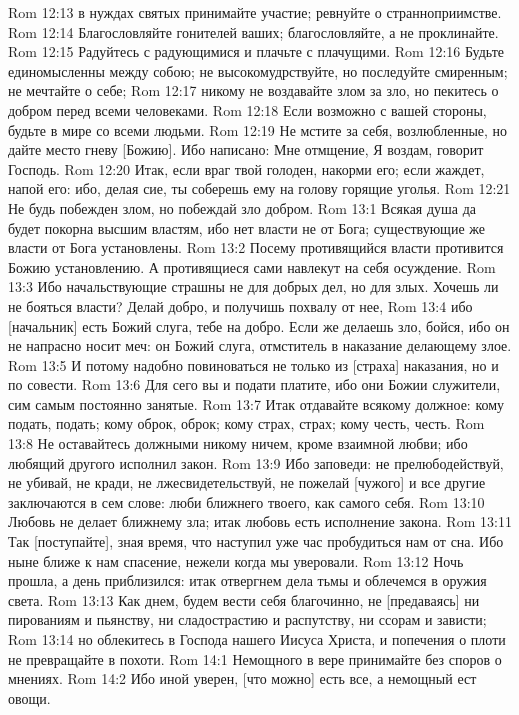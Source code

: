 Rom 12:13  в нуждах святых принимайте участие; ревнуйте о странноприимстве.
Rom 12:14  Благословляйте гонителей ваших; благословляйте, а не проклинайте.
Rom 12:15  Радуйтесь с радующимися и плачьте с плачущими.
Rom 12:16  Будьте единомысленны между собою; не высокомудрствуйте, но последуйте смиренным; не мечтайте о себе;
Rom 12:17  никому не воздавайте злом за зло, но пекитесь о добром перед всеми человеками.
Rom 12:18  Если возможно с вашей стороны, будьте в мире со всеми людьми.
Rom 12:19  Не мстите за себя, возлюбленные, но дайте место гневу [Божию]. Ибо написано: Мне отмщение, Я воздам, говорит Господь.
Rom 12:20  Итак, если враг твой голоден, накорми его; если жаждет, напой его: ибо, делая сие, ты соберешь ему на голову горящие уголья.
Rom 12:21  Не будь побежден злом, но побеждай зло добром.
Rom 13:1  Всякая душа да будет покорна высшим властям, ибо нет власти не от Бога; существующие же власти от Бога установлены.
Rom 13:2  Посему противящийся власти противится Божию установлению. А противящиеся сами навлекут на себя осуждение.
Rom 13:3  Ибо начальствующие страшны не для добрых дел, но для злых. Хочешь ли не бояться власти? Делай добро, и получишь похвалу от нее,
Rom 13:4  ибо [начальник] есть Божий слуга, тебе на добро. Если же делаешь зло, бойся, ибо он не напрасно носит меч: он Божий слуга, отмститель в наказание делающему злое.
Rom 13:5  И потому надобно повиноваться не только из [страха] наказания, но и по совести.
Rom 13:6  Для сего вы и подати платите, ибо они Божии служители, сим самым постоянно занятые.
Rom 13:7  Итак отдавайте всякому должное: кому подать, подать; кому оброк, оброк; кому страх, страх; кому честь, честь.
Rom 13:8  Не оставайтесь должными никому ничем, кроме взаимной любви; ибо любящий другого исполнил закон.
Rom 13:9  Ибо заповеди: не прелюбодействуй, не убивай, не кради, не лжесвидетельствуй, не пожелай [чужого] и все другие заключаются в сем слове: люби ближнего твоего, как самого себя.
Rom 13:10  Любовь не делает ближнему зла; итак любовь есть исполнение закона.
Rom 13:11  Так [поступайте], зная время, что наступил уже час пробудиться нам от сна. Ибо ныне ближе к нам спасение, нежели когда мы уверовали.
Rom 13:12  Ночь прошла, а день приблизился: итак отвергнем дела тьмы и облечемся в оружия света.
Rom 13:13  Как днем, будем вести себя благочинно, не [предаваясь] ни пированиям и пьянству, ни сладострастию и распутству, ни ссорам и зависти;
Rom 13:14  но облекитесь в Господа нашего Иисуса Христа, и попечения о плоти не превращайте в похоти.
Rom 14:1  Немощного в вере принимайте без споров о мнениях.
Rom 14:2  Ибо иной уверен, [что можно] есть все, а немощный ест овощи.
